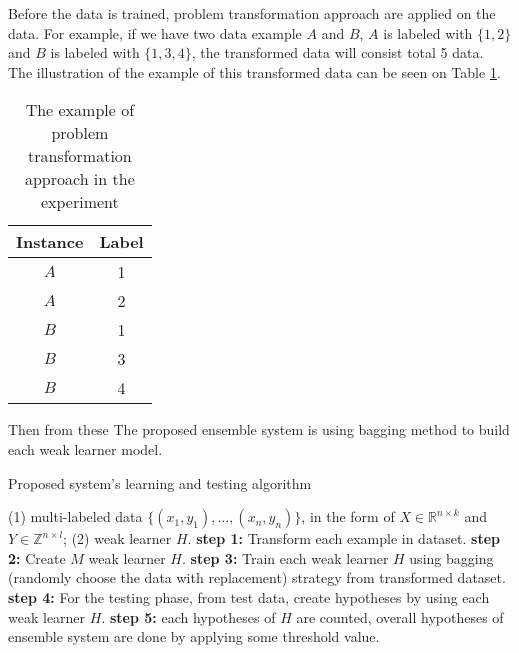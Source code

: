 \documentclass{article}
\begin{document}
Before the data is trained, problem transformation approach are applied on the data. For example, if we have two data example $A$ and $B$, $A$ is labeled with $\{1,2\}$ and $B$ is labeled with $\{1,3,4\}$, the transformed data will consist total 5 data. The illustration of the example of this transformed data can be seen on Table \ref{tab:transformation}.

\begin{table}[t]
\caption{The example of problem transformation approach in the experiment}
\label{tab:transformation}
\vskip 0.15in
\begin{center}
\begin{small}
\begin{sc}
\begin{tabular}{cc}
\hline
\abovespace\belowspace
Instance & Label \\
\hline
\abovespace
$A$    	& 1  \\
$A$ 	& 2 \\
$B$ 	& 1 \\
$B$ 	& 3 \\
\belowspace
$B$ 	& 4 \\
\hline
\end{tabular}
\end{sc}
\end{small}
\end{center}
\vskip -0.1in
\end{table}

Then from these The proposed ensemble system is using bagging method to build each weak learner model. 


\begin{algorithm}[tb]
   \caption{Proposed system's learning and testing algorithm}
   \label{alg:example}
\begin{algorithmic}
    (1) multi-labeled data $\{(x_1, y_1),\dots,(x_n,y_n)\}$, in the form of $X \in \mathbb{R}^{n \times k}$ and $Y \in \mathbb{Z}^{n \times l}$; (2) weak learner $H$.
   \STATE \textbf{step 1:} Transform each example in dataset.
   \STATE \textbf{step 2:} Create $M$ weak learner $H$.
   \STATE \textbf{step 3:} Train each weak learner $H$ using bagging (randomly choose the data with replacement) strategy from transformed dataset.
   \STATE \textbf{step 4:} For the testing phase, from test data, create hypotheses by using each weak learner $H$.
   \STATE \textbf{step 5:} each hypotheses of $H$ are counted, overall hypotheses of ensemble system are done by applying some threshold value.
\end{algorithmic}
\end{algorithm}
\end{document}
